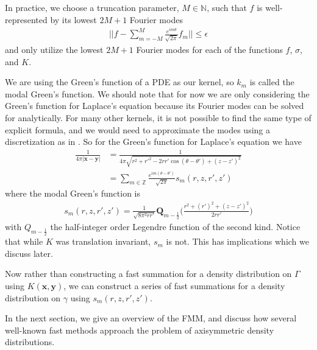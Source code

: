 \documentclass[11pt, oneside]{article}   	%
\begin{document}
In practice, we choose a truncation parameter, $M\in\mathbb{N}$, such that $f$ is well-represented by its lowest $2M+1$ Fourier modes
\begin{align}
||f-\sum\limits_{m=-M}^{M}\frac{e^{im\theta}}{\sqrt{2\pi}}f_m||\le\epsilon
\end{align}
and only utilize the lowest $2M+1$ Fourier modes for each of the functions $f$, $\sigma$, and $K$.

We are using the Green's function of a PDE as our kernel, so $k_m$ is called the modal Green's function. We should note that for now we are only considering the Green's function for Laplace's equation because its Fourier modes can be solved for analytically. For many other kernels, it is not possible to find the same type of explicit formula, and we would need to approximate the modes using a discretization as in \cite{YYM}. So for the Green's function for Laplace's equation we have
\begin{align}
\frac{1}{4\pi |\mathbf{x}-\mathbf{y}|} &=\frac{1}{4\pi\sqrt{r^2+r'^2-2rr'\cos{(\theta-\theta')}+(z-z')^2}}\\
&= \sum_{m\in\mathbb{Z}} \frac{e^{im(\theta-\theta')}}{\sqrt{2\pi}} s_m(r,z,r',z')
\end{align}
where the modal Green's function is
\begin{align}
s_m(r,z,r',z')=\frac{1}{\sqrt{8\pi^3 rr'}}\mathbf{Q}_{m-\frac{1}{2}}\bigg(\frac{r^2+(r')^2+(z-z')^2}{2rr'}\bigg)
\end{align}
with $Q_{m-\frac{1}{2}}$ the half-integer order Legendre function of the second kind. Notice that while $K$ was translation invariant, $s_m$ is not. This has implications which we discuss later.

Now rather than constructing a fast summation for a density distribution on $\Gamma$ using $K(\mathbf{x},\mathbf{y})$, we can construct a series of fast summations for a density distribution on $\gamma$ using $s_m(r,z,r',z')$.

In the next section, we give an overview of the FMM, and discuss how several well-known fast methods approach the problem of axisymmetric density distributions.
\end{document}
